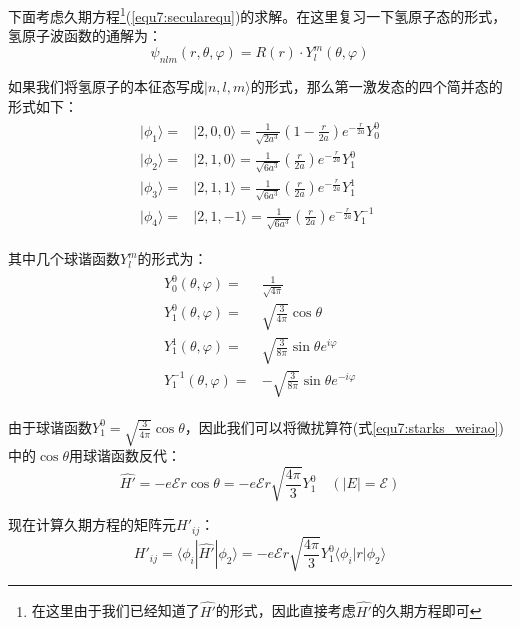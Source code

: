 下面考虑久期方程\footnote{在这里由于我们已经知道了$\hat{H'}$的形式，因此直接考虑$\hat{H'}$的久期方程即可}(\eqref{equ7:secularequ})的求解。在这里复习一下氢原子态的形式，氢原子波函数的通解为：
\begin{equation}
    \psi_{nlm}(r,\theta,\varphi)=R(r)\cdot Y_l^m(\theta,\varphi )
\end{equation}

如果我们将氢原子的本征态写成$|n,l,m\rangle$的形式，那么第一激发态的四个简并态的形式如下：
\begin{align}
    \begin{split}
        |\phi_1\rangle=&|2,0,0\rangle=\frac{1}{\sqrt{2a^3}}(1-\frac{r}{2a})e^{-\frac{r}{2a}}Y_0^0\\
        |\phi_2\rangle=&|2,1,0\rangle=\frac{1}{\sqrt{6a^3}}(\frac{r}{2a})e^{-\frac{r}{2a}}Y_1^0\\
        |\phi_3\rangle=&|2,1,1\rangle=\frac{1}{\sqrt{6a^3}}(\frac{r}{2a})e^{-\frac{r}{2a}}Y_1^1\\
        |\phi_4\rangle=&|2,1,-1\rangle=\frac{1}{\sqrt{6a^3}}(\frac{r}{2a})e^{-\frac{r}{2a}}Y_1^{-1}
    \end{split}
\end{align}

其中几个球谐函数$Y_l^m$的形式为：
\begin{align}
    \begin{split}
        Y_0^0(\theta,\varphi)=&\frac{1}{\sqrt{4\pi}}\\
        Y_1^0(\theta,\varphi)=&\sqrt{\frac{3}{4\pi}}\cos\theta\\
        Y_1^1(\theta,\varphi)=&\sqrt{\frac{3}{8\pi}}\sin\theta e^{i\varphi}\\
        Y_1^{-1}(\theta,\varphi)=&-\sqrt{\frac{3}{8\pi}}\sin\theta e^{-i\varphi}
    \end{split}
\end{align}

由于球谐函数$Y_1^0=\sqrt{\frac{3}{4\pi}}\cos\theta$，因此我们可以将微扰算符(式\eqref{equ7:starks_weirao})中的$\cos\theta$用球谐函数反代：
\begin{equation}
    \hat{H'}=-e\mathscr{E}r\cos\theta=-e\mathscr{E}r\sqrt{\frac{4\pi}{3}}Y_1^0 \quad (|E|=\mathscr{E})
\end{equation}

现在计算久期方程的矩阵元$H'_{ij}$：
\begin{equation}
    H'_{ij}=\langle\phi_i|\hat{H'}|\phi_2\rangle=-e\mathscr{E}r\sqrt{\frac{4\pi}{3}}Y_1^0\langle\phi_i|r|\phi_2\rangle
\end{equation}

